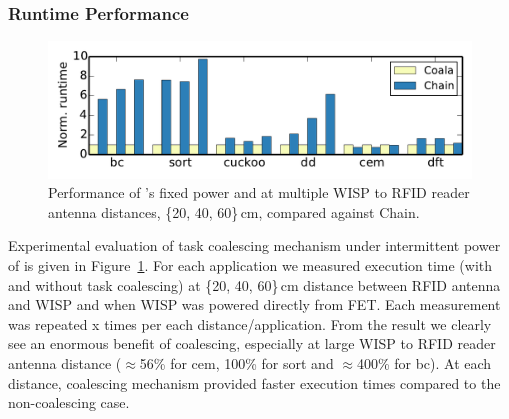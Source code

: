 \subsubsection{\sys Runtime Performance}
\label{sec:result_coalescing}

\begin{figure}
	\centering
	\includegraphics[width=\columnwidth]{figures/coala_chain}
	\caption{Performance of \sys's fixed power and at multiple WISP to RFID reader antenna distances, \{20, 40, 60\}\,cm, compared against Chain.}
	\label{fig:coalescing}
\end{figure}

Experimental evaluation of task coalescing mechanism under intermittent power of \sys is given in Figure~\ref{fig:coalescing}. For each application we measured execution time (with and without task coalescing) at \{20, 40, 60\}\,cm distance between RFID antenna and WISP and when WISP was powered directly from FET. Each measurement was repeated x times per each distance/application. From the result we clearly see an enormous benefit of coalescing, especially at large WISP to RFID reader antenna distance ($\approx$56\% for cem, 100\% for sort and $\approx$400\% for bc). At each distance, \sys coalescing mechanism provided faster execution times compared to the non-coalescing case. 


